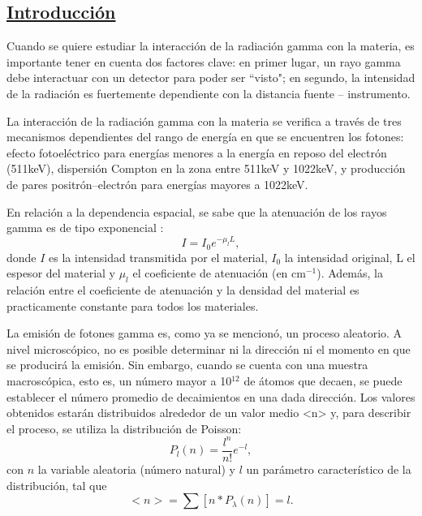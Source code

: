 \documentclass[twoside]{article}
\begin{document}
\begin{multicols}{2} %


\section*{\underline{Introducción}}
\noindent Cuando se quiere estudiar la interacción de la  radiación gamma con la materia, es importante tener en cuenta dos factores clave: en primer lugar, un rayo gamma debe interactuar con un detector para poder ser ``visto"; en segundo, la intensidad de la radiación es fuertemente dependiente con la distancia fuente -- instrumento.

La interacción de la radiación gamma con la materia se verifica a través de tres mecanismos dependientes del rango de energía en que se encuentren los fotones\cite{Nelson}: efecto fotoeléctrico para energías menores a la energía en reposo del electrón (511keV), dispersión Compton en la zona entre 511keV y 1022keV, y producción de pares positrón--electrón para energías mayores a 1022keV. %

En relación a la dependencia espacial, se sabe que la atenuación de los rayos gamma es de tipo exponencial \cite{Nelson}:
\begin{equation}
    I = I_0  e^{-\mu _l L},
\end{equation}
donde $I$ es la intensidad transmitida por el material, $I_0$ la intensidad original, L el espesor del material y $\mu_l$ el coeficiente de atenuación (en cm$^{-1}$). Además, la relación entre el coeficiente de atenuación y la densidad del material es practicamente constante para todos los materiales.

\iffalse

La emisión de fotones gamma es, como ya se mencionó, un proceso aleatorio\cite{poisson}. A nivel microscópico, no es posible determinar ni la dirección ni el momento en que se producirá la emisión. Sin embargo, cuando se cuenta con una muestra macroscópica, esto es, un número mayor a 10$^{12}$ de átomos que decaen, se puede establecer el número promedio de decaimientos en una dada dirección. Los valores obtenidos estarán distribuidos alrededor de un valor medio <n>  y, para describir el proceso, se utiliza la distribución de Poisson:
\begin{equation}
    P_l (n) = \frac{l^n}{n!} e^{-l}, 
\end{equation}
con $n$ la variable aleatoria (número natural) y $l$ un parámetro característico de la distribución, tal que
\begin{equation}
    <n> = \sum [n*P_{\lambda}(n)] = l.
\end{equation}


\end{multicols}
\end{document}
